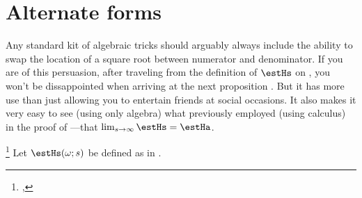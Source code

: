 \section{Alternate forms}
Any standard kit of algebraic tricks should arguably always include the ability to
swap the location of a square root between numerator and denominator.
If you are of this persuasion, after traveling from 
the definition of $\estHs$ on , you won't be dissappointed when arriving
at the next proposition .
But it has more use than just allowing you to entertain friends at social occasions.
It also makes it very easy to see (using only algebra) what previously 
employed  (using calculus)
in the proof of ---that $\lim_{s\to\infty}\estHs=\estHa$.
\begin{proposition}                                                               %
\footnote{                                                                        %
  ,                                   %
  }                                                                               %
\label{prop:Hs}                                                                   %
Let $\estHs(\omega; s)$ be defined as in .
\end{proposition}
